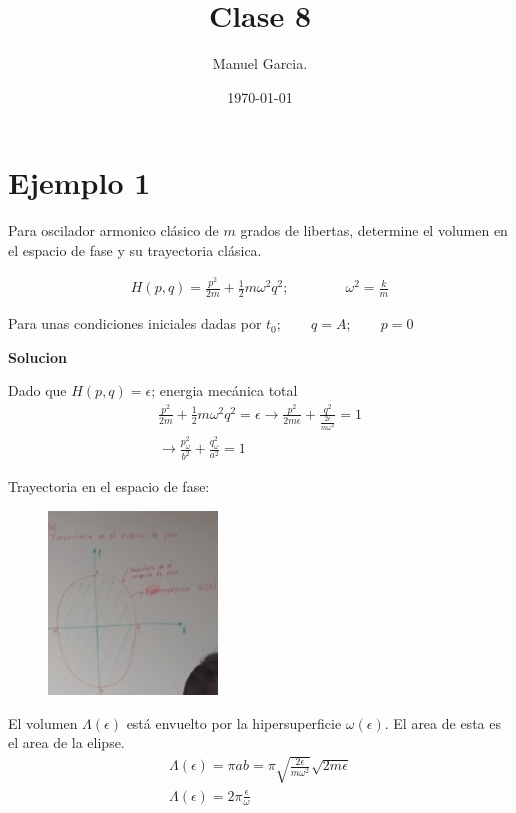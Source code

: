\documentclass{article}
\title{Clase 8 }
\author{Manuel Garcia.}
\date{\today}
\begin{document}
\maketitle

\section{Ejemplo 1}
Para oscilador armonico clásico de $ m  $ grados de libertas, determine el volumen en el espacio de fase y su trayectoria clásica.

\begin{gather*}
  H(p,q) = \frac{p^2 }{2m } + \frac{1}{2} m \omega ^2 q ^2 ; \qquad \qquad \omega ^2 = \frac{k}{m } 
\end{gather*}

 Para unas condiciones iniciales dadas por $ t_0; \qquad q = A; \qquad p = 0  $ 

 \hfill 

 \hfill 

\textbf{Solucion }

 Dado que $ H(p, q) = \epsilon $; energia mecánica total 
 \begin{gather*}
   \frac{p^2 }{2m } + \frac{1}{2} m \omega ^2 q ^2 = \epsilon \rightarrow \frac{p^2 }{2m\epsilon } + \frac{q ^2 }{\frac{2\epsilon }{m \omega ^2}} = 1\\
   \rightarrow \frac{p _{\omega} ^2}{b ^2} + \frac{q_\omega ^2}{a ^2} = 1
 \end{gather*}

 Trayectoria en el espacio de fase: 
 \begin{figure}[H]
  \begin{center}
    \includegraphics[width=0.4\textwidth]{espacio_fase.jpg}
  \end{center}
\end{figure}



El volumen $ \Lambda(\epsilon) $ está envuelto por la hipersuperficie $ \omega(\epsilon) $. El area de esta es el area de la elipse. 
\begin{gather*}
  \Lambda(\epsilon) = \pi ab = \pi \sqrt{\frac{2\epsilon}{m \omega^2 }}  \sqrt{2m\epsilon} \\
  \Lambda(\epsilon) = 2\pi \frac{\epsilon}{\omega}
\end{gather*}
\end{document}
